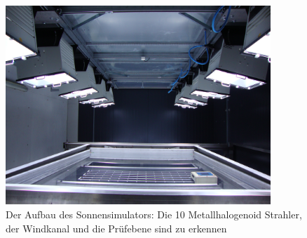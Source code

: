 \documentclass[a4paper,bibtotoc,oneside]{scrbook}
\begin{document}
\begin{figure}[htbp]
\centering
\includegraphics[width=100mm]{img/sunsimulator.jpg}
\caption[Sonnensimulator]{Der Aufbau des Sonnensimulators: Die 10 Metallhalogenoid Strahler, der Windkanal und die Prüfebene sind zu erkennen}\label{sunsim}
\end{figure}
\end{document}
